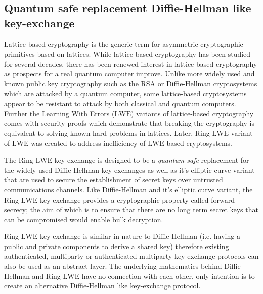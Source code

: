 
\subsection{Quantum safe replacement Diffie-Hellman like key-exchange}
Lattice-based cryptography is the generic term for asymmetric cryptographic primitives based on lattices. While lattice-based cryptography has been studied for several decades, there has been renewed interest in lattice-based cryptography as prospects for a real quantum computer improve. Unlike more widely used and known public key cryptography such as the RSA or Diffie-Hellman cryptosystems which are attacked by a quantum computer, some lattice-based cryptosystems appear to be resistant to attack by both classical and quantum computers. Further the Learning With Errors ($\mathrm{LWE}$) variants of lattice-based cryptography comes with security proofs which demonstrate that breaking the cryptography is equivalent to solving known hard problems in lattices. Later, Ring-$\mathrm{LWE}$ variant of $\mathrm{LWE}$ was created to address inefficiency of $\mathrm{LWE}$ based cryptosystems.

The Ring-$\mathrm{LWE}$ key-exchange is designed to be a \textit{quantum safe} replacement for the widely used Diffie-Hellman key-exchanges as well as it's elliptic curve variant that are used to secure the establishment of secret keys over untrusted communications channels. Like Diffie-Hellman and it's elliptic curve variant, the Ring-$\mathrm{LWE}$ key-exchange provides a cryptographic property called forward secrecy; the aim of which is to ensure that there are no long term secret keys that can be compromised would enable bulk decryption.

Ring-$\mathrm{LWE}$ key-exchange is similar in nature to Diffie-Hellman (i.e. having a public and private components to derive a shared key) therefore existing authenticated, multiparty or authenticated-multiparty key-exchange protocols can also be used as an abstract layer. The underlying mathematics behind Diffie-Hellman and Ring-$\mathrm{LWE}$ have no connection with each other, only intention is to create an alternative Diffie-Hellman like key-exchange protocol.